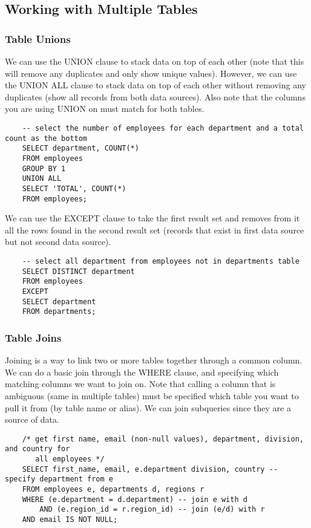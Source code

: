 \documentclass[11pt, a4paper]{article}
\begin{document}
\begin{spacing}{1.1}
	\subsection{Working with Multiple Tables} 
	\subsubsection{Table Unions}
	We can use the UNION clause to stack data on top of each other (note that this will remove any duplicates and only show unique values). However, we can use the UNION ALL clause to stack data on top of each other without removing any duplicates (show all records from both data sources). Also note that the columns you are using UNION on must match for both tables. 
	\begin{lstlisting}
	-- select the number of employees for each department and a total count as the bottom
	SELECT department, COUNT(*)
	FROM employees
	GROUP BY 1
	UNION ALL
	SELECT 'TOTAL', COUNT(*)
	FROM employees;	\end{lstlisting} \vspace*{1mm}
	We can use the EXCEPT clause to take the first result set and removes from it all the rows found in the second result set (records that exist in first data source but not second data source). 
	\begin{lstlisting}
	-- select all department from employees not in departments table
	SELECT DISTINCT department
	FROM employees
	EXCEPT
	SELECT department
	FROM departments; \end{lstlisting} \vspace*{1mm}
	\subsubsection{Table Joins}
	Joining is a way to link two or more tables together through a common column. We can do a basic join through the WHERE clause, and specifying which matching columns we want to join on. Note that calling a column that is ambiguous (same in multiple tables) must be specified which table you want to pull it from (by table name or alias). We can join subqueries since they are a source of data.
	\begin{lstlisting}
	/* get first name, email (non-null values), department, division, and country for 
	   all employees */
	SELECT first_name, email, e.department division, country -- specify department from e
	FROM employees e, departments d, regions r
	WHERE (e.department = d.department) -- join e with d
		AND (e.region_id = r.region_id) -- join (e/d) with r
	AND email IS NOT NULL; 
	

\end{lstlisting}
\end{spacing}
\end{document}
